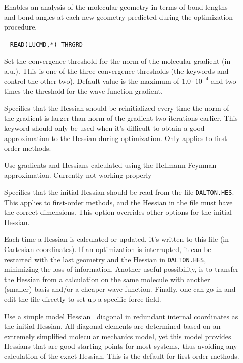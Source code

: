 \begin{description}
\item[]
Enables an analysis of the molecular geometry in terms of bond lengths
and bond angles at each new geometry predicted during the optimization
procedure.

\item[]\verb| |
\newline
\verb|READ(LUCMD,*) THRGRD|

Set the convergence threshold for the norm of the molecular gradient (in
a.u.). This is one of
the three convergence thresholds (the keywords  and
 control the other two). Default value is the maximum of
$1.0\cdot 10^{-4}$ and two times the threshold for the wave function
gradient.

\item[]
Specifies that the Hessian should be
reinitialized every time the norm
of the gradient is larger than norm of the gradient two iterations
earlier. This keyword should only be used when it's difficult to
obtain a good approximation to the Hessian during optimization. Only
applies to first-order methods.

\item[]
Use gradients and Hessians calculated using the Hellmann-Feynman
approximation. Currently not working properly

\item[]
Specifies that the initial Hessian
should be read from the file \verb|DALTON.HES|. This applies to first-order
methods, and the Hessian in the file must have the correct
dimensions. This option overrides other options for the initial
Hessian.

Each time a Hessian is calculated or updated,
it's written to this file (in Cartesian coordinates). If an
optimization is interrupted, it can be restarted with the
last geometry and the Hessian in \verb|DALTON.HES|, minimizing the
loss of information. Another useful possibility, is to transfer
the Hessian from a calculation on the same molecule with another
(smaller) basis and/or a cheaper wave function. Finally, one can go in
and edit the file directly to set up a specific force field.

\item[]
Use a simple model Hessian~\cite{rlabgkpamcpl241} diagonal in redundant
internal coordinates as the initial Hessian. All diagonal elements are
determined based on an extremely simplified molecular mechanics model,
yet this model provides Hessians that are good starting points for
most systems, thus avoiding any calculation of the exact Hessian. This
is the default for first-order methods.


\end{description}
